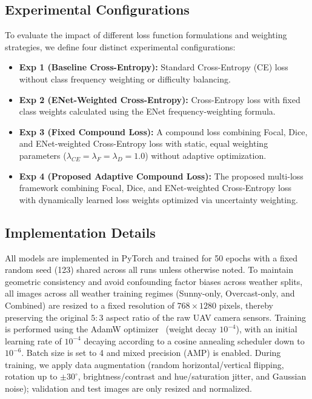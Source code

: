 \documentclass[journal,compsoc]{IEEEtran}
\begin{document}
\subsection{Experimental Configurations}
To evaluate the impact of different loss function formulations and weighting strategies, we define four distinct experimental configurations:
\begin{itemize}
    \item \textbf{Exp 1 (Baseline Cross-Entropy):} Standard Cross-Entropy (CE) loss without class frequency weighting or difficulty balancing.
    \item \textbf{Exp 2 (ENet-Weighted Cross-Entropy):} Cross-Entropy loss with fixed class weights calculated using the ENet frequency-weighting formula.
    \item \textbf{Exp 3 (Fixed Compound Loss):} A compound loss combining Focal, Dice, and ENet-weighted Cross-Entropy loss with static, equal weighting parameters ($\lambda_{CE} = \lambda_F = \lambda_D = 1.0$) without adaptive optimization.
    \item \textbf{Exp 4 (Proposed Adaptive Compound Loss):} The proposed multi-loss framework combining Focal, Dice, and ENet-weighted Cross-Entropy loss with dynamically learned loss weights optimized via uncertainty weighting.
\end{itemize}

\subsection{Implementation Details}
All models are implemented in PyTorch and trained for 50 epochs with a fixed random seed (123) shared across all runs unless otherwise noted. To maintain geometric consistency and avoid confounding factor biases across weather splits, all images across all weather training regimes (Sunny-only, Overcast-only, and Combined) are resized to a fixed resolution of $768 \times 1280$ pixels, thereby preserving the original $5:3$ aspect ratio of the raw UAV camera sensors. Training is performed using the AdamW optimizer~\cite{loshchilov2019adamw} (weight decay $10^{-4}$), with an initial learning rate of $10^{-4}$ decaying according to a cosine annealing scheduler down to $10^{-6}$. Batch size is set to 4 and mixed precision (AMP) is enabled. During training, we apply data augmentation (random horizontal/vertical flipping, rotation up to $\pm 30^\circ$, brightness/contrast and hue/saturation jitter, and Gaussian noise); validation and test images are only resized and normalized.
\end{document}
